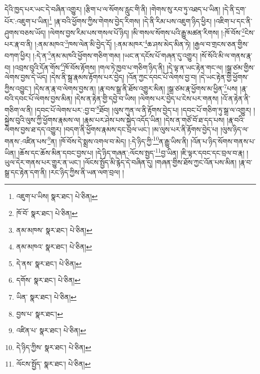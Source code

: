 དེའི་ཁྱད་པར་ཡང་དེ་བཞིན་འགྱུར། །རྩིག་པ་ལ་སོགས་རླུང་གི་ནི། །གེགས་སུ་རབ་ཏུ་འཐད་པ་ཡིན། །དེ་ནི་དྲག་པོར་:འཇུག་པ་ཡིན།\footnote{འཇུག་པ་ཡིས།  སྣར་ཐང་།  པེ་ཅིན། } །རྣ་བའི་ཕྱོགས་ཀྱིས་གེགས་བྱེད་རིགས། །དེ་ནི་རིམ་པས་འཇུག་ཉིད་ཕྱིར། །འཇིག་པ་དང་ནི་ཤུགས་བཅས་ཡོད། །ལེགས་བྱས་རིམ་པས་གསལ་པོ་ཉིད། །མི་གསལ་སོགས་པའི་རྒྱུ་མཚན་རིགས། །:ཁོ་བོས་\footnote{ཁོ་བོ་  སྣར་ཐང་།  པེ་ཅིན། }ངེས་པར་རྣ་བ་ནི། །:ནམ་མཁའ་\footnote{ནམ་མཁས་  སྣར་ཐང་།  པེ་ཅིན། }ཁས་ལེན་མི་བྱེད་དོ། །:ནམ་མཁར་\footnote{ནམ་མཁའ་  སྣར་ཐང་།  པེ་ཅིན། }ཆ་ཤས་མེད་མིན་ཏེ། །རྒྱལ་བ་གྲངས་ཅན་གྱིས་བཀག་ཕྱིར། །:དེ་ན་\footnote{དེ་ནས་  སྣར་ཐང་།  པེ་ཅིན། }ནམ་མཁའི་ཕྱོགས་གཅིག་གམ། །ཡང་ན་དངོས་པོ་གཞན་དུ་འགྱུར། །སོ་སོའི་མི་ལ་གནས་རྣ་བ། །འབྲས་བུའི་དོན་གོས་\footnote{དགོས་  སྣར་ཐང་།  པེ་ཅིན། }ཁོ་བོས་རྟོགས། །གལ་ཏེ་ཁྱབ་པ་གཅིག་ཉིད་ནི། །དེ་ལྟ་ན་ཡང་རྟེན་གང་ལ། །སྒྲ་ཙམ་གྱིས་ལེགས་བྱས་དེ་ཡོད། །དེས་ནི་སྒྲ་རྣམས་རྟོགས་པར་བྱེད། །འོན་ཀྱང་དབང་པོ་ལེགས་བྱ་བ། །དེ་ཡང་རྟེན་གྱི་ཕྱོགས་ཀྱིས་འབྱུང་། །དེས་ན་རྣ་བ་ལེགས་བྱས་ན། །རྣ་བས་སྒྲ་ནི་ཐོས་འགྱུར་མིན། །སྒྲ་ཙམ་རྣ་ཕྱོགས་མ་ཕྱིན་\footnote{ཡིན་  སྣར་ཐང་།  པེ་ཅིན། }པས། །རྣ་བའི་དབང་པོ་ལེགས་བྱས་མིན། །དེས་ན་རྟེན་གྱི་དབྱེ་བ་ཡིས། །ལེགས་པར་བྱེད་པ་ངེས་པར་གནས། །འོ་ན་རྟེན་ནི་གཅིག་ལ་ནི། །དབང་པོ་ལེགས་པར་:བྱ་བ་\footnote{བྱས་པ་  སྣར་ཐང་། }ཐོབ། །ལུས་ཀུན་ལ་ནི་རྟོགས་བྱེད་པ། །དབང་པོ་གཅིག་ཏུ་སྒྲ་ལ་འགྱུར། །སྐྱེས་བུའི་ལུས་ཀྱི་ཕྱོགས་རྣམས་ལ། །རྣམ་པར་ཤེས་པས་སྐྱེད་འདོད་ཡིན། །དེས་ན་གཙོ་བོ་ཐ་དད་པས། །རྣ་བའི་ལེགས་བྱས་ཐ་དད་འགྱུར། །བདག་ནི་ཕྱོགས་རྣམས་དང་བྲལ་ཡང་། །མ་ལུས་པར་ནི་རྟོགས་བྱེད་པ། །ལུས་ཉིད་ལ་གནས་:འཛིན་པས་\footnote{འཛིན་པ་  སྣར་ཐང་།  པེ་ཅིན། }ན། །ཁོ་བོས་དེ་སྨྲས་འགལ་བ་མེད། །:དེ་ཉིད་ཀྱི་\footnote{དེ་ཉིད་ཀྱིས་  སྣར་ཐང་།  པེ་ཅིན། }ན་རྒྱུ་ཡིས་ནི། །འོན་པ་ཉིད་སོགས་གནས་པ་ཡིན། །ཆོས་དང་ཆོས་མིན་དབང་བྱས་པ། །དེ་ཉིད་གཞན་:ལོངས་སྤྱད་\footnote{ལོངས་སྤྱོད་  སྣར་ཐང་།  པེ་ཅིན། }བྱ་ཡིན། །ཇི་ལྟར་དབང་དང་བྲལ་བ་རྣ། །ཡུལ་དེར་གནས་པར་གྱུར་ན་ཡང་། །ལོངས་སྤྱོད་མི་རྙེད་དེ་བཞིན་དུ། །གཞན་གྱིས་ཐོས་ཀྱང་འོན་པས་མིན། །རྣ་བ་སྒྲ་དང་རྟེན་དག་ནི། །རང་ཉིད་ཀྱིས་ནི་ཡན་ལག་བྲལ། །
